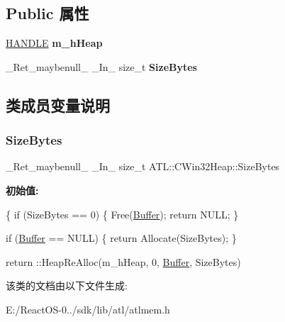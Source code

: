\subsection*{Public 属性}
\begin{DoxyCompactItemize}
\item 
\mbox{\label{class_a_t_l_1_1_c_win32_heap_a25a11642f7a7b70f3526af218f6fa899}} 
\hyperlink{interfacevoid}{H\+A\+N\+D\+LE} {\bfseries m\+\_\+h\+Heap}
\item 
\+\_\+\+Ret\+\_\+maybenull\+\_\+ \+\_\+\+In\+\_\+ size\+\_\+t {\bfseries Size\+Bytes}
\end{DoxyCompactItemize}


\subsection{类成员变量说明}
\mbox{\label{class_a_t_l_1_1_c_win32_heap_af05f3ded79ee6a1ff8594fa4a9e4b019}} 
\subsubsection{\texorpdfstring{Size\+Bytes}{SizeBytes}}
{\footnotesize\ttfamily \+\_\+\+Ret\+\_\+maybenull\+\_\+ \+\_\+\+In\+\_\+ size\+\_\+t A\+T\+L\+::\+C\+Win32\+Heap\+::\+Size\+Bytes}

{\bfseries 初始值\+:}
\begin{DoxyCode}
\{
        \textcolor{keywordflow}{if} (SizeBytes == 0)
        \{
            Free(\hyperlink{class_buffer}{Buffer});
            \textcolor{keywordflow}{return} NULL;
        \}

        \textcolor{keywordflow}{if} (\hyperlink{class_buffer}{Buffer} == NULL)
        \{
            \textcolor{keywordflow}{return} Allocate(SizeBytes);
        \}

        return ::HeapReAlloc(m\_hHeap, 0, \hyperlink{class_buffer}{Buffer}, SizeBytes)
\end{DoxyCode}


该类的文档由以下文件生成\+:\begin{DoxyCompactItemize}
\item 
E\+:/\+React\+O\+S-\/0../sdk/lib/atl/atlmem.\+h\end{DoxyCompactItemize}
